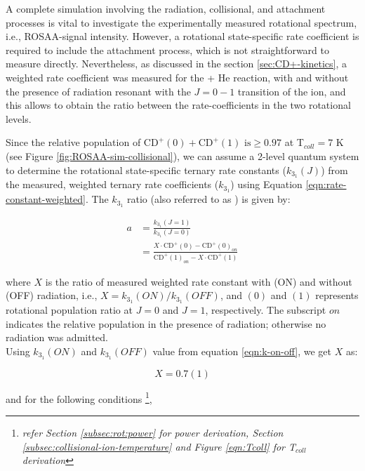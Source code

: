 A complete simulation involving the radiation, collisional, and attachment
processes is vital to investigate the experimentally measured rotational
spectrum, i.e., ROSAA-signal intensity. However, a rotational state-specific
rate coefficient is required to include the attachment process, which is not
straightforward to measure directly. Nevertheless, as discussed in the section
\ref{sec:CD+-kinetics}, a weighted rate coefficient was measured for the \CD + He 
reaction, with and without the presence of radiation resonant with
the $J=0-1$ transition of the \CD ion, and this allows to obtain the ratio between the
rate-coefficients in the two rotational levels.

Since the relative population of ${\text{CD}^+}(0) + \text{CD}^+(1) \text{ is} \geq 0.97 $
at T$_{coll}=7$ K (see Figure \ref{fig:ROSAA-sim-collisional}), we can assume a
2-level quantum system to determine the rotational state-specific ternary rate
constants ($k_{3_1}(J)$) from the measured, weighted ternary rate coefficients
($k_{3_1}$) using Equation \ref{eqn:rate-constant-weighted}. The $k_{3_1}$
ratio (also referred to as ) is given by:

\begin{equation}
    \begin{split}
        a & = \frac{k_{3_1}(J=1)}{k_{3_1}(J=0)}\\
        & = \frac{X \cdot \text{CD}^+(0) - \text{CD}^+(0)_{on}}{\text{CD}^+(1)_{on} - X\cdot \text{CD}^+(1)}
    \end{split}
    \label{eqns:rate-constant-change-ratio}
\end{equation}

where $X$ is the ratio of measured weighted rate constant with (ON) and without
(OFF) radiation, i.e., $X=k_{3_1}(ON) / k_{3_1}(OFF)$, and \CD$(0)$ and \CD$(1)$
represents \CD rotational population ratio at $J=0$ and $J=1$, respectively.
The subscript $on$ indicates the relative population in the presence of
radiation; otherwise no radiation was admitted.\\

Using $k_{3_1}(ON)$ and $k_{3_1}(OFF)$ value from equation \ref{eqn:k-on-off},
we get $X$ as:

\begin{equation}
    X = 0.7(1)
    \label{eqn:derived-X-value}
\end{equation}

and for the following conditions \footnote{\textit{refer Section
        \ref{subsec:rot:power} for power derivation, Section
        \ref{subsec:collisional-ion-temperature} and Figure \ref{eqn:Tcoll} for
        T$_{coll}$ derivation}},

